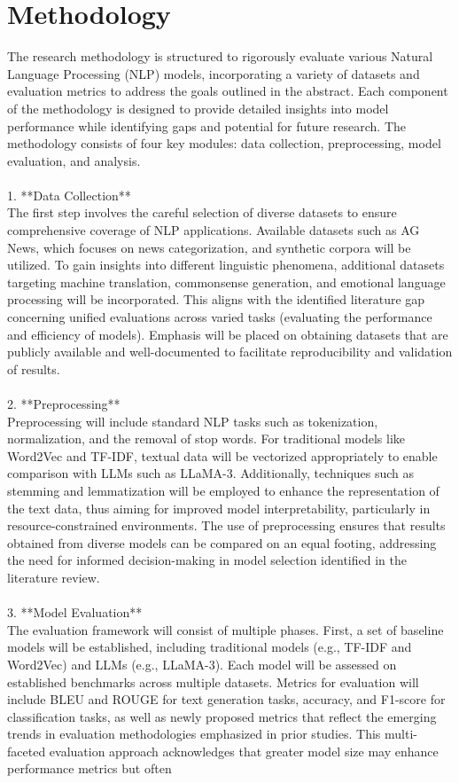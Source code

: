 \documentclass[conference]{IEEEtran}
\begin{document}
\section{Methodology}
\hspace{}The research methodology is structured to rigorously evaluate various Natural Language Processing (NLP) models, incorporating a variety of datasets and evaluation metrics to address the goals outlined in the abstract. Each component of the methodology is designed to provide detailed insights into model performance while identifying gaps and potential for future research. The methodology consists of four key modules: data collection, preprocessing, model evaluation, and analysis.\\\\1. **Data Collection**\\   The first step involves the careful selection of diverse datasets to ensure comprehensive coverage of NLP applications. Available datasets such as AG News, which focuses on news categorization, and synthetic corpora will be utilized. To gain insights into different linguistic phenomena, additional datasets targeting machine translation, commonsense generation, and emotional language processing will be incorporated. This aligns with the identified literature gap concerning unified evaluations across varied tasks (evaluating the performance and efficiency of models). Emphasis will be placed on obtaining datasets that are publicly available and well-documented to facilitate reproducibility and validation of results.\\\\2. **Preprocessing**\\   Preprocessing will include standard NLP tasks such as tokenization, normalization, and the removal of stop words. For traditional models like Word2Vec and TF-IDF, textual data will be vectorized appropriately to enable comparison with LLMs such as LLaMA-3. Additionally, techniques such as stemming and lemmatization will be employed to enhance the representation of the text data, thus aiming for improved model interpretability, particularly in resource-constrained environments. The use of preprocessing ensures that results obtained from diverse models can be compared on an equal footing, addressing the need for informed decision-making in model selection identified in the literature review.\\\\3. **Model Evaluation**\\   The evaluation framework will consist of multiple phases. First, a set of baseline models will be established, including traditional models (e.g., TF-IDF and Word2Vec) and LLMs (e.g., LLaMA-3). Each model will be assessed on established benchmarks across multiple datasets. Metrics for evaluation will include BLEU and ROUGE for text generation tasks, accuracy, and F1-score for classification tasks, as well as newly proposed metrics that reflect the emerging trends in evaluation methodologies emphasized in prior studies. This multi-faceted evaluation approach acknowledges that greater model size may enhance performance metrics but often 
\end{document}
